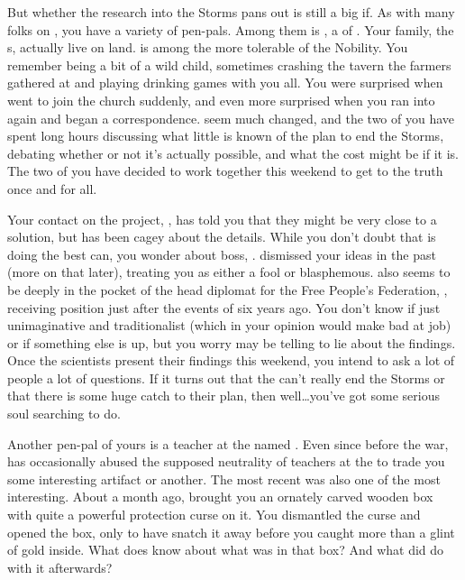 \documentclass[char]{GL2020}
\begin{document}
But whether the research into the Storms pans out is still a big if. As with many folks on \pEarth{}, you have a variety of pen-pals. Among them is \cHedonist{\full}, a \cHedonist{\cleric} of \cFarmGod{}. Your family, the \cCurse{\formal}s, actually live on \cHedonist{\formal} land. \cHedonist{} is among the more tolerable of the Nobility. You remember \cHedonist{} being a bit of a wild child, sometimes crashing the tavern the farmers gathered at and playing drinking games with you all. You were surprised when \cHedonist{\they} went to join the church suddenly, and even more surprised when you ran into \cHedonist{\them} again and began a correspondence.  \cHedonist{\They} seem much changed, and the two of you have spent long hours discussing what little is known of the \pTech{} plan to end the Storms, debating whether or not it's actually possible, and what the cost might be if it is. The two of you have decided to work together this weekend to get to the truth once and for all. 

Your contact on the project, \cAssistantScientist{}, has told you that they might be very close to a solution, but has been cagey about the details. While you don’t doubt that \cAssistantScientist{} is doing the best \cAssistantScientist{\they} can, you wonder about \cAssistantScientist{\their} boss, \cHeadScientist{\full}. \cHeadScientist{\they} dismissed your ideas in the past (more on that later), treating you as either a fool or blasphemous. \cHeadScientist{\they} also seems to be deeply in the pocket of the head diplomat for the Free People’s Federation, \cDiplomat{\full}, receiving \cHeadScientist{\their} position just after the events of six years ago. You don’t know if \cHeadScientist{\they} \cHeadScientist{\are} just unimaginative and traditionalist (which in your opinion would make \cHeadScientist{\them} bad at \cHeadScientist{\their} job) or if something else is up, but you worry \cHeadScientist{\they} may be telling \cAssistantScientist{\they} to lie about the findings. Once the scientists present their findings this weekend, you intend to ask a lot of people a lot of questions. If it turns out that the \pTech{} can't really end the Storms or that there is some huge catch to their plan, then well\ldots{}you've got some serious soul searching to do. 

Another pen-pal of yours is a teacher at the \pSc{} named \cChupSecond{\full}. Even since before the war, \cChupSecond{} has occasionally abused the supposed neutrality of teachers at the \pSc{} to trade you some interesting artifact \cChupSecond{\they} \cChupSecond{\have} or another. The most recent was also one of the most interesting. About a month ago, \cChupSecond{} brought you an ornately carved wooden box with quite a powerful protection curse on it. You dismantled the curse and opened the box, only to have \cChupSecond{} snatch it away before you caught more than a glint of gold inside. What does \cChupSecond{} know about what was in that box? And what did \cChupSecond{\they} do with it afterwards?
\end{document}
